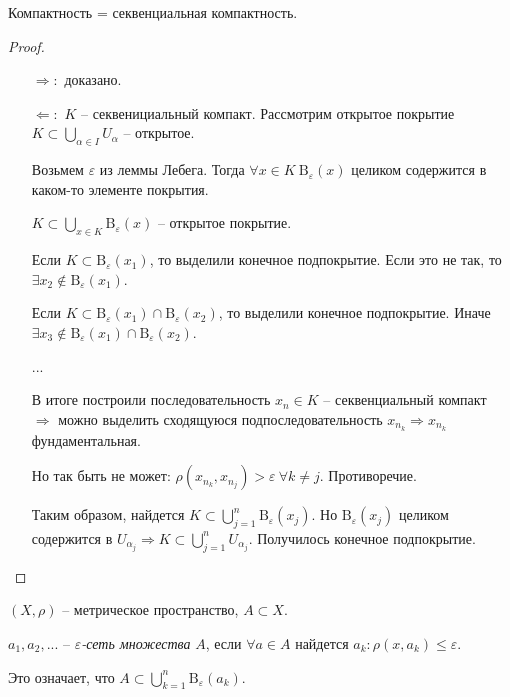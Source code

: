 \begin{theorem}
    Компактность = секвенциальная компактность.
\end{theorem}

\begin{proof}~
    \begin{enumerate}
        \item[$\Rightarrow:$] доказано.
        \item[$\Leftarrow:$] $K$ – секвенициальный компакт. Рассмотрим открытое покрытие $K\subset \bigcup\limits_{\alpha \in I} U_\alpha$ – открытое.

        Возьмем $\varepsilon$ из леммы Лебега. Тогда $\forall x\in K\ \text{B}_\varepsilon (x)$ целиком содержится в каком-то элементе покрытия.
    
        $K\subset\bigcup\limits_{x \in K} \text{B}_\varepsilon (x)$ – открытое покрытие.
        
        Если $K\subset \text{B}_\varepsilon (x_1)$, то выделили конечное подпокрытие. Если это не так, то $\exists x_2\notin \text{B}_\varepsilon (x_1)$.
    
        Если $K\subset \text{B}_\varepsilon (x_1)\cap \text{B}_\varepsilon (x_2)$, то выделили конечное подпокрытие. Иначе $\exists x_3\notin\text{B}_\varepsilon (x_1)\cap \text{B}_\varepsilon (x_2)$.
    
        ...
    
        В итоге построили последовательность $x_n\in K$ – секвенциальный компакт $\Rightarrow$ можно выделить сходящуюся подпоследовательность $x_{n_k}\Rightarrow x_{n_k}$  фундаментальная. 
        
        Но так быть не может: $\rho(x_{n_k}, x_{n_j})>\varepsilon\ \forall k\neq j$. Противоречие.
    
        Таким образом, найдется $K\subset \bigcup\limits_{j=1}^n\text{B}_\varepsilon (x_j)$. Но $\text{B}_\varepsilon (x_j)$ целиком содержится в $U_{\alpha_j}\Rightarrow K\subset \bigcup\limits_{j=1}^n U_{\alpha_j}$. Получилось конечное подпокрытие.
    \end{enumerate}
\end{proof}

\begin{definition}
    $(X, \rho)$ – метрическое пространство, $A\subset X$.

    $a_1, a_2, ...$ – $\varepsilon$\textit{-сеть множества} $A$, если $\forall a\in A$ найдется $a_k:\rho(x, a_k)\leq \varepsilon$.

    Это означает, что $A\subset \bigcup\limits_{k=1}^n\text{B}_\varepsilon (a_k)$.
\end{definition}

